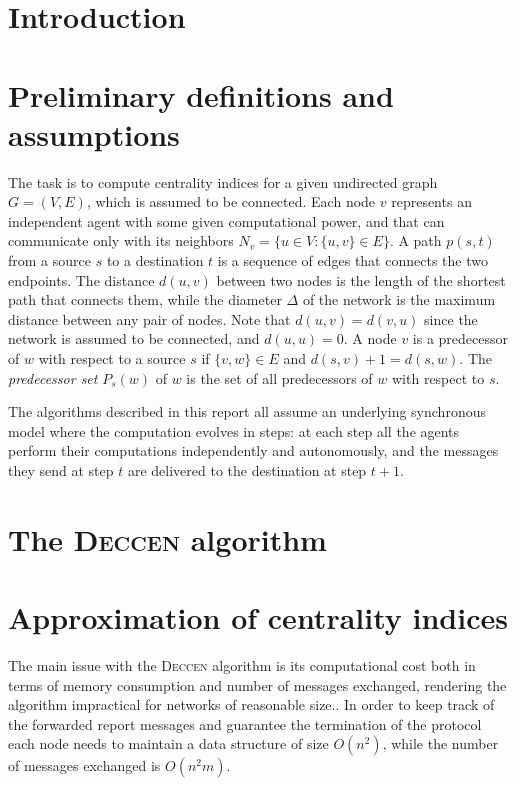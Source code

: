 
\newcommand{\deccen}{\textsc{Deccen}}

\section{Introduction}

\section{Preliminary definitions and assumptions}

The task is to compute centrality indices for a given undirected graph $G = (V,E)$, which is assumed to be connected. Each node $v$ represents an independent agent with some given computational power, and that can communicate only with its neighbors $N_v = \{u \in V : \{u,v\} \in E\}$. A path $p(s,t)$ from a source $s$ to a destination $t$ is a sequence of edges that connects the two endpoints. The distance $d(u,v)$ between two nodes is the length of the shortest path that connects them, while the diameter $\Delta$ of the network is the maximum distance between any pair of nodes. Note that $d(u,v) = d(v,u)$ since the network is assumed to be connected, and $d(u,u) = 0$. A node $v$ is a predecessor of $w$ with respect to a source $s$ if $\{v,w\} \in E$ and $d(s,v) +1 = d(s,w)$. The \emph{predecessor set} $P_s(w)$ of $w$ is the set of all predecessors of $w$ with respect to $s$.

The algorithms described in this report all assume an underlying synchronous model where the computation evolves in steps: at each step all the agents perform their computations independently and autonomously, and the messages they send at step $t$ are delivered to the destination at step $t+1$.

\section{The \deccen{} algorithm}

\section{Approximation of centrality indices}

The main issue with the \deccen{} algorithm is its computational cost both in terms of memory consumption and number of messages exchanged, rendering the algorithm impractical for networks of reasonable size.. In order to keep track of the forwarded report messages and guarantee the termination of the protocol each node needs to maintain a data structure of size $O(n^2)$, while the number of messages exchanged is $O(n^2m)$.


